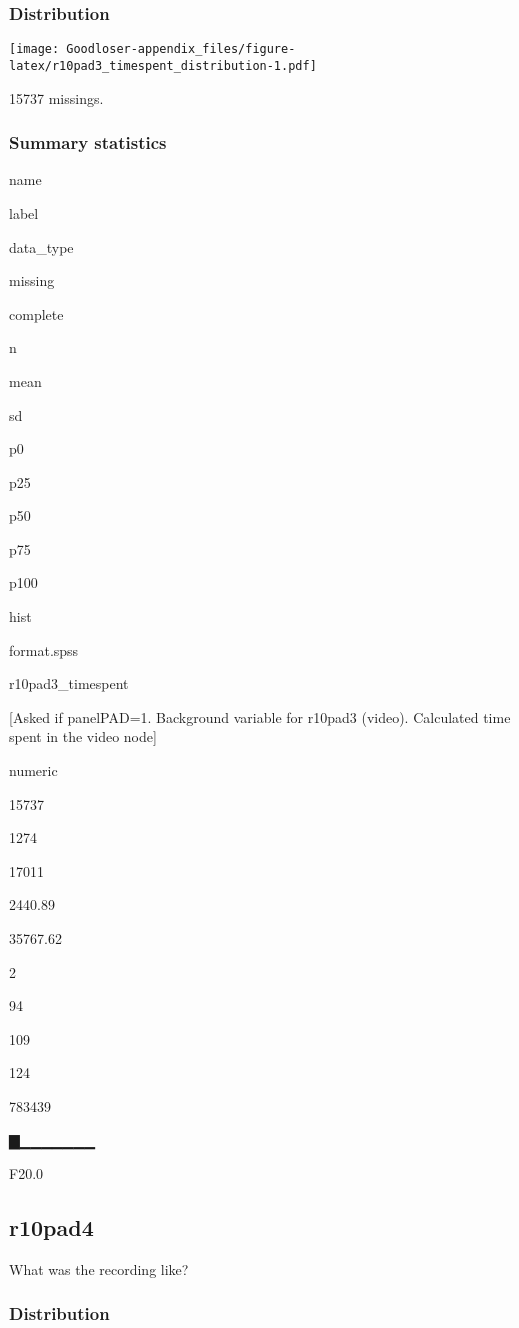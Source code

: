\documentclass[]{book}
\begin{document}
\subsubsection{Distribution}\label{r10pad3_timespent_distribution}

\texttt{[image: Goodloser-appendix\_files/figure-latex/r10pad3\_timespent\_distribution-1.pdf]}

15737 missings.

\subsubsection{Summary statistics}\label{r10pad3_timespent_summary}

name

label

data\_type

missing

complete

n

mean

sd

p0

p25

p50

p75

p100

hist

format.spss

r10pad3\_timespent

{[}Asked if panelPAD=1. Background variable for r10pad3 (video).
Calculated time spent in the video node{]}

numeric

15737

1274

17011

2440.89

35767.62

2

94

109

124

783439

▇▁▁▁▁▁▁▁

F20.0

\subsection{r10pad4}\label{r10pad4}

What was the recording like?

\subsubsection{Distribution}\label{r10pad4_distribution}
\end{document}
